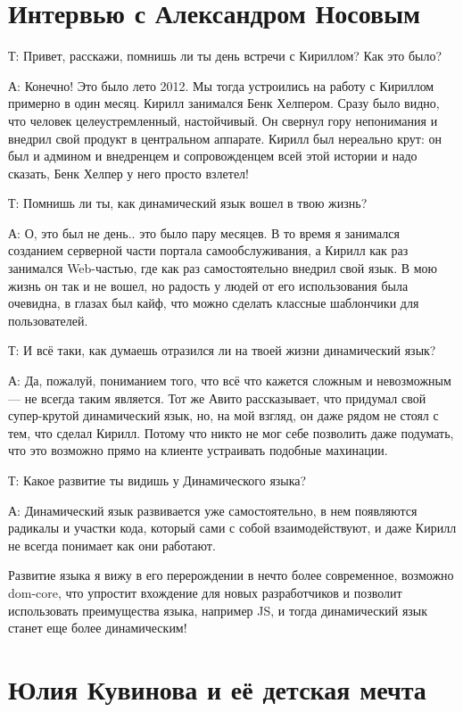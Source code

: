 \documentclass[../index.tex]{subfiles}
\begin{document}
	\section{Интервью с Александром Носовым}
	
	Т:  Привет, расскажи, помнишь ли ты день встречи с Кириллом? Как это было?
	
	А:  Конечно! Это было лето 2012. Мы тогда устроились на работу с Кириллом примерно в один месяц. Кирилл занимался Бенк Хелпером. Сразу было видно, что человек целеустремленный, настойчивый. Он свернул гору непонимания и внедрил свой продукт в центральном аппарате. Кирилл был нереально крут: он был  и админом и внедренцем и сопровожденцем всей этой истории и надо сказать, Бенк Хелпер у него просто взлетел! 
	
	
	Т:  Помнишь ли ты, как динамический язык вошел в твою жизнь?
	
	А:  О, это был не день.. это было пару месяцев. В то время я занимался созданием серверной части портала самообслуживания, а Кирилл как раз занимался Web-частью, где как раз самостоятельно внедрил свой язык. В мою жизнь он так и не вошел, но радость у людей от его использования была очевидна, в глазах был кайф, что можно сделать классные шаблончики для пользователей. 
	
	
	
	Т: И всё таки, как думаешь отразился ли на твоей жизни динамический язык?
	
	А:  Да, пожалуй, пониманием того, что всё что кажется сложным и невозможным — не всегда таким является. Тот же Авито рассказывает, что придумал свой супер-крутой динамический язык, но, на мой взгляд, он даже рядом не стоял с тем, что сделал Кирилл. Потому что никто не мог себе позволить даже  подумать, что это возможно прямо на клиенте устраивать подобные махинации. 
	
	Т:  Какое развитие ты видишь у Динамического языка?
	
	А:  Динамический язык развивается уже самостоятельно, в нем появляются радикалы и участки кода, который сами с собой взаимодействуют, и даже Кирилл не всегда понимает как они работают.
	
	Развитие языка я вижу в его перерождении в нечто более современное, возможно dom-core, что упростит вхождение для новых разработчиков и позволит использовать преимущества языка, например JS, и тогда динамический язык станет еще более динамическим!
	
	\section{Юлия Кувинова и её детская мечта}
	
\end{document}
